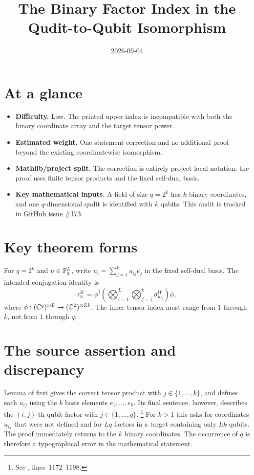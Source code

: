\documentclass[11pt]{article}
\title{The Binary Factor Index in the Qudit-to-Qubit Isomorphism}
\author{}
\date{2026-09-04}
\renewcommand{\ghissue}[1]{%
  \href{https://github.com/Dengnifer/MIPStarRE-QPBT/issues/#1}{GitHub issue \##1}}
\begin{document}
\maketitle

\section{At a glance}

\begin{itemize}
  \item \textbf{Difficulty.} Low.  The printed upper index is incompatible
  with both the binary coordinate array and the target tensor power.
  \item \textbf{Estimated weight.} One statement correction and no additional
  proof beyond the existing coordinatewise isomorphism.
  \item \textbf{Mathlib/project split.} The correction is entirely
  project-local notation; the proof uses finite tensor products and the fixed
  self-dual basis.
  \item \textbf{Key mathematical inputs.} A field of size $q=2^k$ has $k$
  binary coordinates, and one $q$-dimensional qudit is identified with $k$
  qubits.  This audit is tracked in \ghissue{173}.
\end{itemize}

\section{Key theorem forms}

For $q=2^k$ and $u\in\mathbb{F}_q^L$, write
$u_i=\sum_{j=1}^k u_{ij}e_j$ in the fixed self-dual basis.  The intended
conjugation identity is
\[
  \tau_u^W
  =\phi^\dagger
    \left(\bigotimes_{i=1}^L\bigotimes_{j=1}^k
      \sigma^W_{u_{ij}}\right)\phi,
\]
where $\phi:(\mathbb{C}^q)^{\otimes L}\to(\mathbb{C}^2)^{\otimes Lk}$.  The inner tensor index must
range from $1$ through $k$, not from $1$ through $q$.

\section{The source assertion and discrepancy}

Lemma  of \cite[Section~4.6]{Ji2020MIPStar} first gives
the correct tensor product with $j\in\{1,\ldots,k\}$, and defines each
$u_{ij}$ using the $k$ basis elements $e_1,\ldots,e_k$.  Its final sentence,
however, describes the $(i,j)$-th qubit factor with
$j\in\{1,\ldots,q\}$.%
\footnote{See ,
lines~1172--1198.}
For $k>1$ this asks for coordinates $u_{ij}$ that were not defined and for
$Lq$ factors in a target containing only $Lk$ qubits.  The proof immediately
returns to the $k$ binary coordinates.  The occurrence of $q$ is therefore a
typographical error in the mathematical statement.
\end{document}
